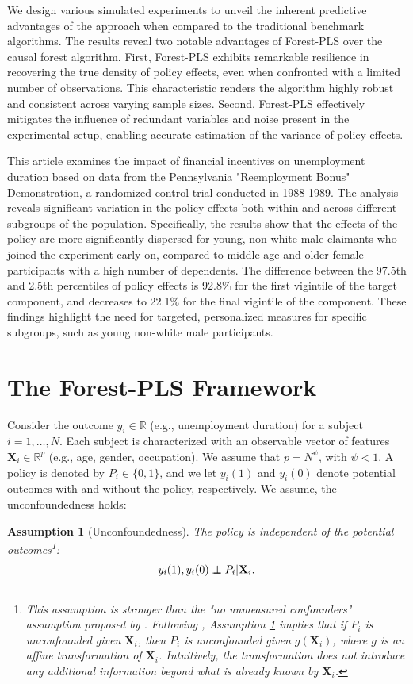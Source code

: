 \documentclass[12pt]{article}
\newtheorem{assump}{Assumption}[section]
\newcommand\independent{\protect\mathpalette{\protect\independenT}{\perp}}
\def\independenT#1#2{\mathrel{\rlap{$#1#2$}\mkern2mu{#1#2}}}
\begin{document}
We design various simulated experiments to unveil the inherent predictive advantages of the approach when compared to the traditional benchmark algorithms. The results reveal two notable advantages of Forest-PLS over the causal forest algorithm. First, Forest-PLS exhibits remarkable resilience in recovering the true density of policy effects, even when confronted with a limited number of observations. This characteristic renders the algorithm highly robust and consistent across varying sample sizes. Second, Forest-PLS effectively mitigates the influence of redundant variables and noise present in the experimental setup, enabling accurate estimation of the variance of policy effects.

This article examines the impact of financial incentives on unemployment duration based on data from the Pennsylvania "Reemployment Bonus" Demonstration, a randomized control trial conducted in 1988-1989. The analysis reveals significant variation in the policy effects both within and across different subgroups of the population. Specifically, the results show that the effects of the policy are more significantly dispersed for young, non-white male claimants who joined the experiment early on, compared to middle-age and older female participants with a high number of dependents. The difference between the 97.5th and 2.5th percentiles of policy effects is 92.8\% for the first vigintile of the target component, and decreases to 22.1\% for the final vigintile of the component. These findings highlight the need for targeted, personalized measures for specific subgroups, such as young non-white male participants.





\section{The Forest-PLS Framework}
Consider the outcome $y_i \in \mathbb{R}$ (e.g., unemployment duration) for a subject $i = 1, \dots, N$. Each subject is characterized with an observable vector of features $\mathbf{X}_{i} \in \mathbb{R}^p$ (e.g., age, gender, occupation). We assume that $p = N^\psi$, with $\psi < 1$.  A policy is denoted by $P_i \in \{0, 1\}$, and we let $y_i(1)$ and $y_i(0)$ denote potential outcomes with and without the policy, respectively. We assume, the unconfoundedness holds:

\begin{assump}[Unconfoundedness]\label{ass_unc} The policy is independent of the potential outcomes\footnote{This assumption is stronger than the "no unmeasured confounders" assumption proposed by \cite{rosenbaum1983central}. Following \cite{rosenbaum1983central}, Assumption \ref{ass_unc} implies that if $P_i$ is unconfounded given $\mathbf{X}_i$, then $P_i$ is unconfounded given $g(\mathbf{X}_i)$, where $g$ is an affine transformation of $\mathbf{X}_i$. Intuitively, the transformation does not introduce any additional information beyond what is already known by $\mathbf{X}_i$. }:
\begin{align*}
    y_i(1), y_i(0) \independent P_i|\mathbf{X}_i. 
\end{align*}
\end{assump}
\end{document}
